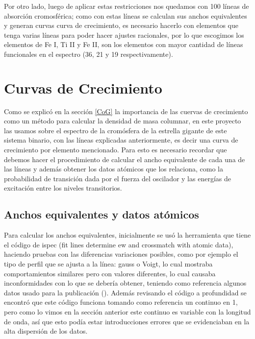 \documentclass[12pt,oneside,openany,letter]{book}
\begin{document}
Por otro lado, luego de aplicar estas restricciones nos quedamos con 100 líneas de absorción cromosférica; como con estas líneas se calculan sus anchos equivalentes y generan curvas curva de crecimiento, es necesario hacerlo con elementos que tenga varias líneas para poder hacer ajustes racionales, por lo que escogimos los elementos de Fe I, Ti II y Fe II, son los elementos con mayor cantidad de líneas funcionales en el espectro (36, 21 y 19 respectivamente).

\chapter{Curvas de Crecimiento}\label{cap4}
Como se explicó en la sección \ref{CoG} la importancia de las cuervas de crecimiento como un método para calcular la densidad de masa columnar, en este proyecto las usamos sobre el espectro de la cromósfera de la estrella gigante de este sistema binario, con las líneas explicadas anteriormente, es decir una curva de crecimiento por elemento mencionado. Para esto es necesario recordar que debemos hacer el procedimiento de calcular el ancho equivalente de cada una de las líneas y además obtener los datos atómicos que los relaciona, como la probabilidad de transición dada por el fuerza del oscilador y las energías de excitación entre los niveles transitorios.


\section{Anchos equivalentes y datos atómicos}
Para calcular los anchos equivalentes, inicialmente se usó la herramienta que tiene el código de ispec (fit lines determine ew and crossmatch with atomic data), haciendo pruebas con las diferencias variaciones posibles, como por ejemplo el tipo de perfil que se ajusta  a la línea: gauss o Voigt, lo cual mostraba comportamientos similares pero con valores diferentes, lo cual causaba inconformidades con lo que se debería obtener, teniendo como referencia algunos datos usado para la publicación (). Además revisando el código a profundidad se encontró que este código funciona tomando como referencia un continuo en 1, pero como lo vimos en la sección anterior este continuo es variable con la longitud de onda, así que esto podía estar introducciones errores que se evidenciaban en la alta dispersión de los datos.
\end{document}

